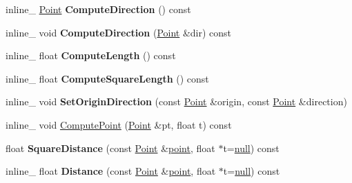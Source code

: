 \begin{DoxyCompactItemize}
\item 
\hypertarget{class_segment_ab16c46daff4a7968e93961c1463cb721}{inline\+\_\+ \hyperlink{class_point}{Point} {\bfseries Compute\+Direction} () const }\label{class_segment_ab16c46daff4a7968e93961c1463cb721}

\item 
\hypertarget{class_segment_a655a68b2dbb98b0fb88852744075d8e5}{inline\+\_\+ void {\bfseries Compute\+Direction} (\hyperlink{class_point}{Point} \&dir) const }\label{class_segment_a655a68b2dbb98b0fb88852744075d8e5}

\item 
\hypertarget{class_segment_ab1e8818ec363cb591a644e271d29810b}{inline\+\_\+ float {\bfseries Compute\+Length} () const }\label{class_segment_ab1e8818ec363cb591a644e271d29810b}

\item 
\hypertarget{class_segment_a23f96f91da3b70a5df97743e565d8ec7}{inline\+\_\+ float {\bfseries Compute\+Square\+Length} () const }\label{class_segment_a23f96f91da3b70a5df97743e565d8ec7}

\item 
\hypertarget{class_segment_a5125897eff3e07e5df4e4c5c98a4910e}{inline\+\_\+ void {\bfseries Set\+Origin\+Direction} (const \hyperlink{class_point}{Point} \&origin, const \hyperlink{class_point}{Point} \&direction)}\label{class_segment_a5125897eff3e07e5df4e4c5c98a4910e}

\item 
inline\+\_\+ void \hyperlink{class_segment_a45b255d4ad881d40bbe924e38d49368b}{Compute\+Point} (\hyperlink{class_point}{Point} \&pt, float t) const 
\item 
\hypertarget{class_segment_adaac64662e3b372e393181b8de576a44}{float {\bfseries Square\+Distance} (const \hyperlink{class_point}{Point} \&\hyperlink{structpoint}{point}, float $\ast$t=\hyperlink{_ice_types_8h_ac97b8ee753e4405397a42ad5799b0f9e}{null}) const }\label{class_segment_adaac64662e3b372e393181b8de576a44}

\item 
\hypertarget{class_segment_a9143629d69ca029c3062916440e7b854}{inline\+\_\+ float {\bfseries Distance} (const \hyperlink{class_point}{Point} \&\hyperlink{structpoint}{point}, float $\ast$t=\hyperlink{_ice_types_8h_ac97b8ee753e4405397a42ad5799b0f9e}{null}) const }\label{class_segment_a9143629d69ca029c3062916440e7b854}

\end{DoxyCompactItemize}
